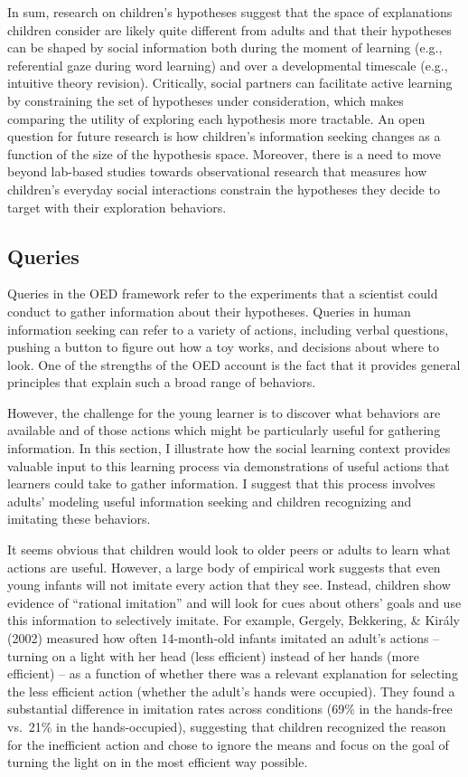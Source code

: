 \documentclass[oneside]{report}
\begin{document}
In sum, research on children's hypotheses suggest that the space of
explanations children consider are likely quite different from adults
and that their hypotheses can be shaped by social information both
during the moment of learning (e.g., referential gaze during word
learning) and over a developmental timescale (e.g., intuitive theory
revision). Critically, social partners can facilitate active learning by
constraining the set of hypotheses under consideration, which makes
comparing the utility of exploring each hypothesis more tractable. An
open question for future research is how children's information seeking
changes as a function of the size of the hypothesis space. Moreover,
there is a need to move beyond lab-based studies towards observational
research that measures how children's everyday social interactions
constrain the hypotheses they decide to target with their exploration
behaviors.

\subsection{Queries}\label{queries}

Queries in the OED framework refer to the experiments that a scientist
could conduct to gather information about their hypotheses. Queries in
human information seeking can refer to a variety of actions, including
verbal questions, pushing a button to figure out how a toy works, and
decisions about where to look. One of the strengths of the OED account
is the fact that it provides general principles that explain such a
broad range of behaviors.

However, the challenge for the young learner is to discover what
behaviors are available and of those actions which might be particularly
useful for gathering information. In this section, I illustrate how the
social learning context provides valuable input to this learning process
via demonstrations of useful actions that learners could take to gather
information. I suggest that this process involves adults' modeling
useful information seeking and children recognizing and imitating these
behaviors.

It seems obvious that children would look to older peers or adults to
learn what actions are useful. However, a large body of empirical work
suggests that even young infants will not imitate every action that they
see. Instead, children show evidence of ``rational imitation'' and will
look for cues about others' goals and use this information to
selectively imitate. For example, Gergely, Bekkering, \& Király (2002)
measured how often 14-month-old infants imitated an adult's actions --
turning on a light with her head (less efficient) instead of her hands
(more efficient) -- as a function of whether there was a relevant
explanation for selecting the less efficient action (whether the adult's
hands were occupied). They found a substantial difference in imitation
rates across conditions (69\% in the hands-free vs.~21\% in the
hands-occupied), suggesting that children recognized the reason for the
inefficient action and chose to ignore the means and focus on the goal
of turning the light on in the most efficient way possible.
\end{document}
